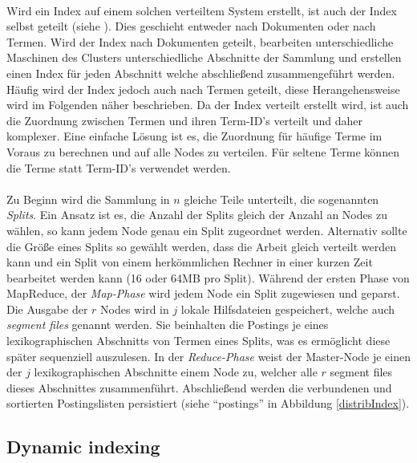 \paragraph{}
Wird ein Index auf einem solchen verteiltem System erstellt, ist auch der Index selbst geteilt (siehe ). Dies geschieht entweder nach Dokumenten oder nach Termen. Wird der Index nach Dokumenten geteilt, bearbeiten unterschiedliche Maschinen des Clusters unterschiedliche Abschnitte der Sammlung und erstellen einen Index für jeden Abschnitt welche abschließend zusammengeführt werden. Häufig wird der Index jedoch auch nach Termen geteilt, diese Herangehensweise wird im Folgenden näher beschrieben. Da der Index verteilt erstellt wird, ist auch die Zuordnung zwischen Termen und ihren Term-ID's verteilt und daher komplexer. Eine einfache Lösung ist es, die Zuordnung für häufige Terme im Voraus zu berechnen und auf alle Nodes zu verteilen. Für seltene Terme können die Terme statt Term-ID's verwendet werden.\par

\paragraph{}
Zu Beginn wird die Sammlung in $n$ gleiche Teile unterteilt, die sogenannten \textit{Splits}. Ein Ansatz ist es, die Anzahl der Splits gleich der Anzahl an Nodes zu wählen, so kann jedem Node genau ein Split zugeordnet werden. Alternativ sollte die Größe eines Splits so gewählt werden, dass die Arbeit gleich verteilt werden kann und ein Split von einem herkömmlichen Rechner in einer kurzen Zeit bearbeitet werden kann (16 oder 64MB pro Split). Während der ersten Phase von MapReduce, der \textit{Map-Phase} wird jedem Node ein Split zugewiesen und geparst. Die Ausgabe der $r$ Nodes wird in $j$ lokale Hilfsdateien gespeichert, welche auch \textit{segment files} genannt werden. Sie beinhalten die Postings je eines lexikographischen Abschnitts von Termen eines Splits, was es ermöglicht diese später sequenziell auszulesen. In der \textit{Reduce-Phase} weist der Master-Node je einen der $j$ lexikographischen Abschnitte einem Node zu, welcher alle $r$ segment files dieses Abschnittes zusammenführt. Abschließend werden die verbundenen und sortierten Postingslisten persistiert (siehe \enquote{postings} in Abbildung \ref{distribIndex}).\par

\subsection{Dynamic indexing}

